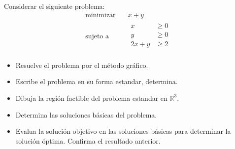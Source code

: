 \documentclass{article}
\begin{document}
Considerar el siguiente problema:
\begin{equation*}
  \begin{aligned}
    \text{minimizar}&\quad x+y\\
    \text{sujeto a}&\quad
    \begin{aligned}
      x&\geq0\\
      y&\geq0\\
      2x+y&\geq2\\      
    \end{aligned}
  \end{aligned}
\end{equation*}
\begin{itemize}
\item Resuelve el problema por el método gráfico.
\item Escribe el problema en su forma estandar, determina.
\item Dibuja la región factible del problema estandar en $\mathbb{R}^{3}$.
\item Determina las soluciones básicas del problema.
  \item Evalua la solución objetivo en las soluciones básicas para determinar la solución óptima. Confirma el resultado anterior.
\end{itemize}
\end{document}
